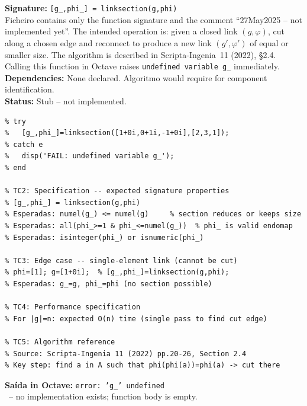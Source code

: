 \chapter{}
\begin{tcolorbox}[Abox,title={Analysis}]
\textbf{Signature:} \lstinline|[g_,phi_] = linksection(g,phi)|\\
Ficheiro contains only the function signature and the comment ``27May2025 -- not implemented yet''. The intended operation is: given a closed link $(g,\varphi)$, cut along a chosen edge and reconnect to produce a new link $(g',\varphi')$ of equal or smaller size. The algorithm is described in Scripta-Ingenia~11 (2022), \S2.4. Calling this function in Octave raises \texttt{undefined variable g\_} immediately.\\[4pt]
\textbf{Dependencies:} None declared. Algoritmo would require  for component identification.\\[4pt]
\textbf{Status:} Stub -- not implemented.
\end{tcolorbox}
\begin{lstlisting}[caption={Tests for linksection.m (static analysis + specification)}]
% TC1: Call raises error in Octave (static analysis confirmed)
% try
%   [g_,phi_]=linksection([1+0i,0+1i,-1+0i],[2,3,1]);
% catch e
%   disp('FAIL: undefined variable g_');
% end

% TC2: Specification -- expected signature properties
% [g_,phi_] = linksection(g,phi)
% Esperadas: numel(g_) <= numel(g)     % section reduces or keeps size
% Esperadas: all(phi_>=1 & phi_<=numel(g_))  % phi_ is valid endomap
% Esperadas: isinteger(phi_) or isnumeric(phi_)

% TC3: Edge case -- single-element link (cannot be cut)
% phi=[1]; g=[1+0i];  % [g_,phi_]=linksection(g,phi);
% Esperadas: g_=g, phi_=phi (no section possible)

% TC4: Performance specification
% For |g|=n: expected O(n) time (single pass to find cut edge)

% TC5: Algorithm reference
% Source: Scripta-Ingenia 11 (2022) pp.20-26, Section 2.4
% Key step: find a in A such that phi(phi(a))=phi(a) -> cut there
\end{lstlisting}
\begin{tcolorbox}[Fbox,title={TC1 -- Calling raises runtime error}]
\textbf{Saída in Octave:} \texttt{error: 'g\_' undefined}\\
\FALHOU\ -- no implementation exists; function body is empty.
\end{tcolorbox}
